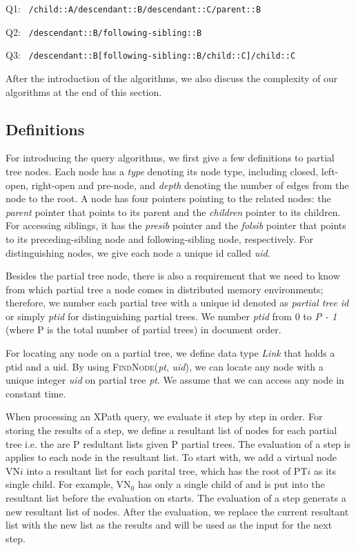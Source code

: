 Q1: \texttt{ /child::A/descendant::B/descendant::C/parent::B}

Q2: \texttt{ /descendant::B/following-sibling::B}

Q3:  \texttt{ /descendant::B[following-sibling::B/child::C]/child::C}

After the introduction of the algorithms, we also discuss the complexity of our
algorithms at the end of this section.


\subsection{Definitions}

For introducing the query algorithms, we first give a few definitions to partial
tree nodes. Each node has a \textit{type} denoting its node type, including
closed, left-open, right-open and pre-node, and \textit{depth} denoting the
number of edges from the node to the root. A node has four pointers pointing to
the related nodes: the \textit{parent} pointer that points to its parent and the
\textit{children} pointer to its children. For accessing siblings, it has the
\textit{presib} pointer and the \textit{folsib} pointer that points to its
preceding-sibling node and following-sibling node, respectively. For
distinguishing nodes, we give each node a unique id called \textit{uid}.

Besides the partial tree node, there is also a requirement that we need to know
from which partial tree a node comes in distributed memory environments;
therefore, we number each partial tree with a unique id denoted as
\textit{partial tree id} or simply \textit{ptid} for distinguishing partial
trees. We number \textit{ptid} from 0 to \textit{P - 1} (where P is the total
number of partial trees) in document order.

For locating any node on a partial tree, we define data type \textit{Link} that
holds a ptid and a uid. By using \textsc{FindNode}(\textit{pt}, \textit{uid}),
we can locate any node with a unique integer \textit{uid} on partial tree
\textit{pt}. We assume that we can access any node in constant time.

When processing an XPath query, we evaluate it step by step in order. For
storing the results of a step, we define a resultant list of nodes for each
partial tree i.e. the are P reslultant lists given P partial trees. The
evaluation of a step is applies to each node in the resultant list. To start
with, we add a virtual node VN$i$ into a resultant list for each parital tree,
which has the root of PT$i$ as its single child. For example, VN$_0$ has only a
single child  of  and is put into the resultant list before the
evaluation on  starts. The evaluation of a step generats a new resultant
list of nodes. After the evaluation, we replace the current resultant list with
the new list as the results and will be used as the input for the next step.


